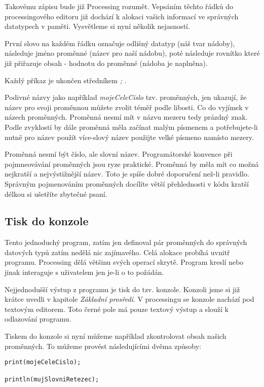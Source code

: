 \documentclass[11pt]{article} %
\begin{document}
Takovému zápisu bude již Processing rozumět. Vepsáním těchto řádků do processingového editoru již dochází k alokaci vašich informací ve správných datatypech v paměti. Vysvětleme si nyní několik nejasností.

První slovo na každém řádku označuje odlišný datatyp (náš tvar nádoby), následuje jméno proměnné (název pro naší nádobu), poté následuje rovnítko které již přiřazuje obsah - hodnotu do proměnné (nádoba je naplněna).

Každý příkaz je ukončen středníkem {\em ;} .

Podivné názvy jako například {\em mojeCeleCislo} tzv. proměnných, jen ukazují, že název pro svoji proměnnou můžete zvolit téměř podle libosti. Co do vyjímek v názech proměnných. Proměnná nesmí mít v názvu mezeru tedy prázdný znak. Podle zvyklostí by dále proměnná měla začínat malým písmenem a potřebujete-li nutně pro název použít více-slový název použijte velké písmeno namísto mezery.

Proměnná nesmí být číslo, ale slovní název. Programátorské konvence při pojmneovávání proměnných jsou ryze praktické. Proměnná by měla mít co možná nejkratší a nejvýstižnější název.  Toto je spíše dobré doporučení než-li pravidlo. Správným pojmenováním proměnných docílíte větší přehlednosti v kódu kratší délkou si ušetříte zbytečné psaní.

\subsection{Tisk do konzole}

Tento jednoduchý program, zatím jen definoval pár proměnných do správných datových typů zatím nedělá nic zajímavého. Celá alokace probíhá uvnitř programu. Processing dělá většinu svých operací skrytě. Program kreslí nebo jinak interaguje s uživatelem jen je-li o to požádán.

Nejjednodušší výstup z programu je tisk do tzv. konzole. Konzoli jsme si již krátce uvedli v kapitole {\em Základní prosředí}. V processingu se konzole nachází pod textovým editorem. Toto černé pole má pouze textový výstup a slouží k odlazování programu.

Tiskem do konzole si nyní můžeme například zkontrolovat obsah našich proměnných. To můžeme provést následujícími dvěma způsoby:


\begin{verbatim}
print(mojeCeleCislo);

println(mujSlovniRetezec);
\end{verbatim}
\end{document}

